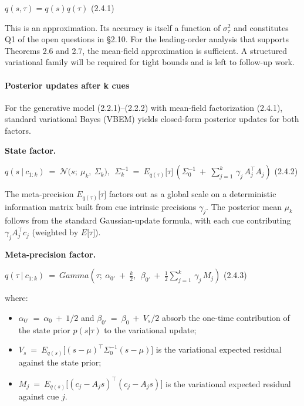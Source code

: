 \documentclass{article}
\providecommand{\tightlist}{\setlength{\itemsep}{0pt}\setlength{\parskip}{0pt}}
\begin{document}
\(q(s,\tau) = q(s)q(\tau)\) (2.4.1)

This is an approximation. Its accuracy is itself a function of
\(\sigma_{\tau}^{2}\) and constitutes Q1 of the open questions in \S{}2.10.
For the leading-order analysis that supports Theorems 2.6 and 2.7, the
mean-field approximation is sufficient. A structured variational family
will be required for tight bounds and is left to follow-up work.

\paragraph{Posterior updates after k
cues}\label{posterior-updates-after-k-cues}

For the generative model (2.2.1)--(2.2.2) with mean-field factorization
(2.4.1), standard variational Bayes (VBEM) yields closed-form posterior
updates for both factors.

\textbf{State factor.}

\(q(s\ |\ c_{1:k})\  = \ \mathcal{N(}s;\ \mu_{k},\ \Sigma_{k}),\ \ \Sigma_{k}^{- 1}\  = \ E_{q(\tau)}\lbrack\tau\rbrack\,\left( \Sigma_{0}^{- 1}\  + \ \sum_{j = 1}^{k}\,\gamma_{j}\, A_{j}^{\top}A_{j} \right)\)
(2.4.2)

The meta-precision \(E_{q(\tau)}\lbrack\tau\rbrack\) factors out as a
global scale on a deterministic information matrix built from cue
intrinsic precisions \(\gamma_{j}\). The posterior mean \(\mu_{k}\)
follows from the standard Gaussian-update formula, with each cue
contributing \(\gamma_{j}A_{j}^{\top}c_{j}\) (weighted by
\(E\lbrack\tau\rbrack\)).

\textbf{Meta-precision factor.}

\(q(\tau\ |\ c_{1:k})\  = \ Gamma\left( \tau;\ \alpha_{0'}\  + \ \frac{k}{2},\ \ \beta_{0'}\  + \ \frac{1}{2}\sum_{j = 1}^{k}\,\gamma_{j}\, M_{j} \right)\)
(2.4.3)

where:

\begin{itemize}
\tightlist
\item
  \(\alpha_{0'}\  = \ \alpha_{0}\  + \ 1/2\) and
  \(\beta_{0'}\  = \ \beta_{0}\  + \ V_{s}/2\) absorb the one-time
  contribution of the state prior \(p(s|\tau)\) to the variational
  update;
\item
  \(V_{s}\  = \ E_{q(s)}\lbrack(s - \mu)^{\top}\Sigma_{0}^{- 1}(s - \mu)\rbrack\)
  is the variational expected residual against the state prior;
\item
  \(M_{j}\  = \ E_{q(s)}\lbrack(c_{j} - A_{j}s)^{\top}(c_{j} - A_{j}s)\rbrack\)
  is the variational expected residual against cue \(j\).
\end{itemize}
\end{document}
